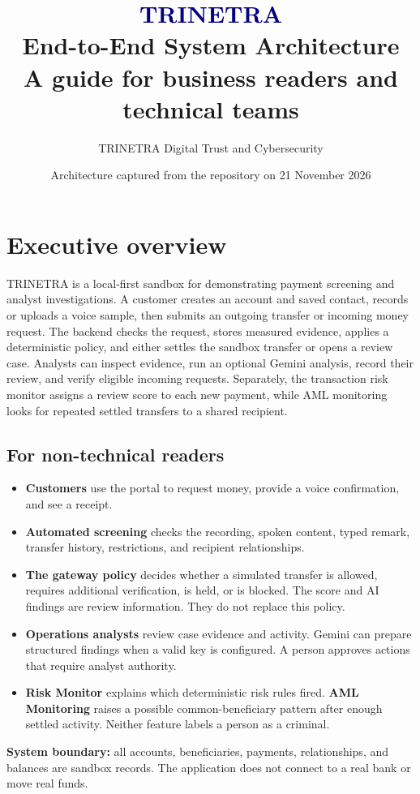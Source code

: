 \documentclass[11pt,a4paper]{article}
\title{\vspace{-1.3cm}\textcolor{navy}{TRINETRA}\\[3pt]\large End-to-End System Architecture\\\normalsize A guide for business readers and technical teams}
\author{TRINETRA Digital Trust and Cybersecurity}
\date{Architecture captured from the repository on 21 November 2026}
\begin{document}
\maketitle
\begin{center}
\end{center}
\tableofcontents
\newpage

\section{Executive overview}
TRINETRA is a local-first sandbox for demonstrating payment screening and analyst investigations. A customer creates an account and saved contact, records or uploads a voice sample, then submits an outgoing transfer or incoming money request. The backend checks the request, stores measured evidence, applies a deterministic policy, and either settles the sandbox transfer or opens a review case. Analysts can inspect evidence, run an optional Gemini analysis, record their review, and verify eligible incoming requests. Separately, the transaction risk monitor assigns a review score to each new payment, while AML monitoring looks for repeated settled transfers to a shared recipient.

\subsection{For non-technical readers}
\begin{itemize}
\item \textbf{Customers} use the portal to request money, provide a voice confirmation, and see a receipt.
\item \textbf{Automated screening} checks the recording, spoken content, typed remark, transfer history, restrictions, and recipient relationships.
\item \textbf{The gateway policy} decides whether a simulated transfer is allowed, requires additional verification, is held, or is blocked. The score and AI findings are review information. They do not replace this policy.
\item \textbf{Operations analysts} review case evidence and activity. Gemini can prepare structured findings when a valid key is configured. A person approves actions that require analyst authority.
\item \textbf{Risk Monitor} explains which deterministic risk rules fired. \textbf{AML Monitoring} raises a possible common-beneficiary pattern after enough settled activity. Neither feature labels a person as a criminal.
\end{itemize}
\textbf{System boundary:} all accounts, beneficiaries, payments, relationships, and balances are sandbox records. The application does not connect to a real bank or move real funds.
\end{document}
